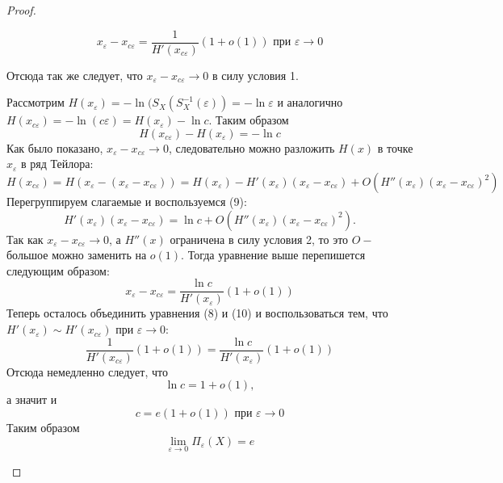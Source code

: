 \documentclass[12pt]{article}
\theoremstyle{plain}
\theoremstyle{definition}
\theoremstyle{remark}
\begin{document}
\begin{proof}
\begin{enumerate}
    \begin{equation}
        x_{\varepsilon} - x_{c\varepsilon} =\frac{1}{H'(x_{c\varepsilon})}(1+o(1))  \text{ при } \varepsilon \to 0
    \end{equation}

    Отсюда так же следует, что $x_{\varepsilon} - x_{c\varepsilon} \to 0$ в силу условия 1.
    
    Рассмотрим $H(x_{\varepsilon}) = -\ln(S_X(S_X^{-1}(\varepsilon)) = -\ln\varepsilon$ и аналогично $H(x_{c\varepsilon}) = -\ln(c\varepsilon) = H(x_{\varepsilon}) -\ln c$.
    Таким образом 
    \begin{equation}
        H(x_{c\varepsilon}) - H(x_{\varepsilon}) = -\ln c
    \end{equation}
    Как было показано, $x_{\varepsilon} - x_{c\varepsilon} \to 0$, следовательно можно разложить $H(x)$ в точке $x_{\varepsilon}$ в ряд Тейлора:
    \[
        H(x_{c\varepsilon}) = H(x_{\varepsilon} - (x_{\varepsilon} - x_{c\varepsilon})) = H(x_{\varepsilon}) - H'(x_{\varepsilon})(x_{\varepsilon} - x_{c\varepsilon}) + O(H''(x_{\varepsilon})(x_{\varepsilon} - x_{c\varepsilon})^2)
    \]
    Перегруппируем слагаемые и воспользуемся (9):
    \[
        H'(x_{\varepsilon})(x_{\varepsilon} - x_{c\varepsilon}) = \ln c + O(H''(x_{\varepsilon})(x_{\varepsilon} - x_{c\varepsilon})^2).
    \]
    Так как $x_{\varepsilon} - x_{c\varepsilon} \to 0$, а $H''(x)$ ограничена в силу условия 2, то это $O-$большое можно заменить на $o(1)$. Тогда уравнение выше перепишется следующим образом:
    \begin{equation}
        x_{\varepsilon} - x_{c\varepsilon} = \frac{\ln c}{H'(x_{\varepsilon})}(1+o(1))
    \end{equation}
    Теперь осталось объединить уравнения (8) и (10) и воспользоваться тем, что $H'(x_{\varepsilon}) \sim H'(x_{c\varepsilon})$ при $\varepsilon \to 0$:
    \[
        \frac{1}{H'(x_{c\varepsilon})}(1+o(1)) = \frac{\ln c}{H'(x_{\varepsilon})}(1+o(1))
    \]
    Отсюда немедленно следует, что 
    \[
        \ln c = 1 + o(1),
    \]
    а значит и 
    \[
        c = e(1+o(1)) \text{ при } \varepsilon \to 0
    \]
    Таким образом 
    \[
        \lim_{\varepsilon \to 0}\Pi_\varepsilon(X) = e
    \]
    
    \end{enumerate}
\end{proof}
\end{document}
